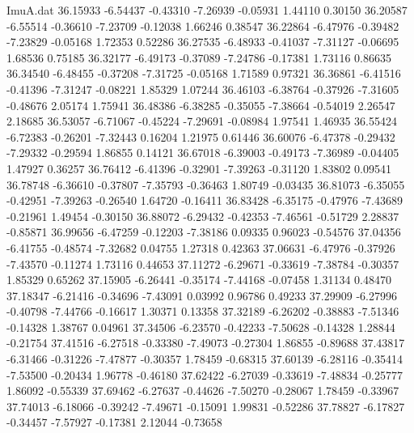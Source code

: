 \begin{filecontents}{ImuA.dat}
  36.15933   -6.54437   -0.43310   -7.26939   -0.05931    1.44110    0.30150
  36.20587   -6.55514   -0.36610   -7.23709   -0.12038    1.66246    0.38547
  36.22864   -6.47976   -0.39482   -7.23829   -0.05168    1.72353    0.52286
  36.27535   -6.48933   -0.41037   -7.31127   -0.06695    1.68536    0.75185
  36.32177   -6.49173   -0.37089   -7.24786   -0.17381    1.73116    0.86635
  36.34540   -6.48455   -0.37208   -7.31725   -0.05168    1.71589    0.97321
  36.36861   -6.41516   -0.41396   -7.31247   -0.08221    1.85329    1.07244
  36.46103   -6.38764   -0.37926   -7.31605   -0.48676    2.05174    1.75941
  36.48386   -6.38285   -0.35055   -7.38664   -0.54019    2.26547    2.18685
  36.53057   -6.71067   -0.45224   -7.29691   -0.08984    1.97541    1.46935
  36.55424   -6.72383   -0.26201   -7.32443    0.16204    1.21975    0.61446
  36.60076   -6.47378   -0.29432   -7.29332   -0.29594    1.86855    0.14121
  36.67018   -6.39003   -0.49173   -7.36989   -0.04405    1.47927    0.36257
  36.76412   -6.41396   -0.32901   -7.39263   -0.31120    1.83802    0.09541
  36.78748   -6.36610   -0.37807   -7.35793   -0.36463    1.80749   -0.03435
  36.81073   -6.35055   -0.42951   -7.39263   -0.26540    1.64720   -0.16411
  36.83428   -6.35175   -0.47976   -7.43689   -0.21961    1.49454   -0.30150
  36.88072   -6.29432   -0.42353   -7.46561   -0.51729    2.28837   -0.85871
  36.99656   -6.47259   -0.12203   -7.38186    0.09335    0.96023   -0.54576
  37.04356   -6.41755   -0.48574   -7.32682    0.04755    1.27318    0.42363
  37.06631   -6.47976   -0.37926   -7.43570   -0.11274    1.73116    0.44653
  37.11272   -6.29671   -0.33619   -7.38784   -0.30357    1.85329    0.65262
  37.15905   -6.26441   -0.35174   -7.44168   -0.07458    1.31134    0.48470
  37.18347   -6.21416   -0.34696   -7.43091    0.03992    0.96786    0.49233
  37.29909   -6.27996   -0.40798   -7.44766   -0.16617    1.30371    0.13358
  37.32189   -6.26202   -0.38883   -7.51346   -0.14328    1.38767    0.04961
  37.34506   -6.23570   -0.42233   -7.50628   -0.14328    1.28844   -0.21754
  37.41516   -6.27518   -0.33380   -7.49073   -0.27304    1.86855   -0.89688
  37.43817   -6.31466   -0.31226   -7.47877   -0.30357    1.78459   -0.68315
  37.60139   -6.28116   -0.35414   -7.53500   -0.20434    1.96778   -0.46180
  37.62422   -6.27039   -0.33619   -7.48834   -0.25777    1.86092   -0.55339
  37.69462   -6.27637   -0.44626   -7.50270   -0.28067    1.78459   -0.33967
  37.74013   -6.18066   -0.39242   -7.49671   -0.15091    1.99831   -0.52286
  37.78827   -6.17827   -0.34457   -7.57927   -0.17381    2.12044   -0.73658

\end{filecontents}

